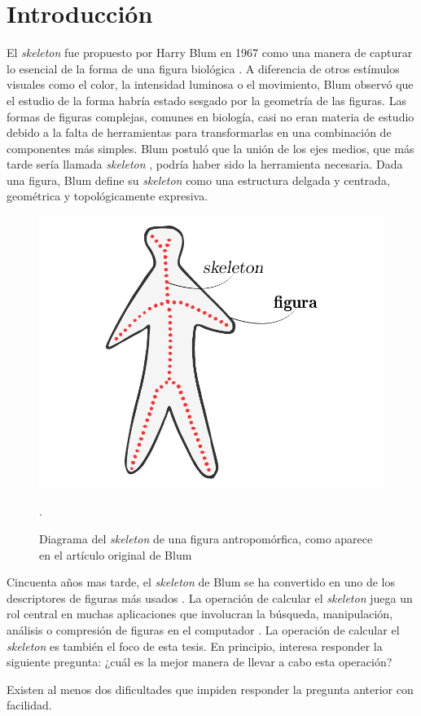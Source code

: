 \chapter{Introducción}
\label{ch:introduction}

El \textit{skeleton} fue propuesto por Harry Blum en 1967 como una manera de capturar lo esencial de la forma de una figura biológica \cite{Blum:1967}. A diferencia de otros estímulos visuales como el color, la intensidad luminosa o el movimiento, Blum observó que el estudio de la forma habría estado sesgado por la geometría de las figuras. Las formas de figuras complejas, comunes en biología, casi no eran materia de estudio debido a la falta de herramientas para transformarlas en una combinación de componentes más simples. Blum postuló que la unión de los ejes medios, que más tarde sería llamada \textit{skeleton} \cite{hilitch1969linear}, podría haber sido la herramienta necesaria. Dada una figura, Blum define su \textit{skeleton} como una estructura delgada y centrada, geométrica y topológicamente expresiva.

\begin{figure}[ht]\centering
\includegraphics[width=0.5\linewidth]{images/blum}
\caption{Diagrama del \textit{skeleton} de una figura antropomórfica, como aparece en el artículo original de Blum \cite{Blum:1967}}.
\label{fig:blum}
\end{figure}

Cincuenta años mas tarde, el \textit{skeleton} de Blum se ha convertido en uno de los descriptores de figuras más usados \cite{sobiecki2013qualitative}. La operación de calcular el \textit{skeleton} juega un rol central en muchas aplicaciones que involucran la búsqueda, manipulación, análisis o compresión de figuras en el computador \cite{Saha2015}. La operación de calcular el \textit{skeleton} es también el foco de esta tesis. En principio, interesa responder la siguiente pregunta: ¿cuál es la mejor manera de llevar a cabo esta operación?

Existen al menos dos dificultades que impiden responder la pregunta anterior con facilidad.

